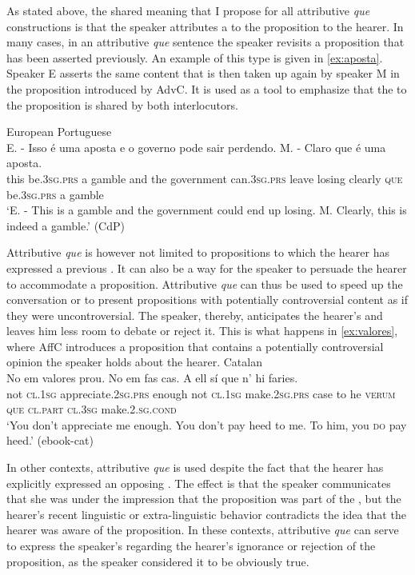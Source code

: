 As stated above, the shared meaning that I propose for all attributive \emph{que} constructions  is that the speaker attributes a  to the proposition to the hearer.  In many cases, in an  attributive \emph{que} sentence the speaker revisits a proposition that has been asserted previously. An example of this type  is given in \eqref{ex:aposta}. Speaker E asserts the same  content that is then taken up again by speaker M in the proposition introduced by AdvC. It is used as a tool to emphasize that the  to the proposition is shared by both interlocutors.\pagebreak


\ea\label{ex:aposta}
European Portuguese\\ 
\gll  E. - Isso é uma aposta e o governo pode sair perdendo.  M. - Claro que é uma aposta. \\
{} {} this be.\textsc{3sg.prs} a gamble and the government can.\textsc{3sg.prs} leave losing {} {} clearly \textsc{que} be.\textsc{3sg.prs} a gamble\\
\glt `E. - This is a gamble and the government could end up losing. M. Clearly, this is indeed a gamble.' (CdP)
\z 

Attributive \textit{que} is however not limited to propositions to which  the hearer has expressed a previous . It can also be a way for the speaker to persuade the hearer to accommodate a proposition. Attributive \emph{que} can thus be used to speed up the conversation or  to present    propositions with potentially controversial content as if they were uncontroversial. The speaker, thereby, anticipates the hearer's  and leaves him less room to debate or reject it. This is what happens in \eqref{ex:valores}, where  AffC introduces a proposition that contains a potentially controversial opinion the speaker holds about the hearer.
\ea\label{ex:valores}
Catalan\\
\gll No em valores prou. No em fas cas. A ell sí que n' hi faries.   \\
not \textsc{cl.1sg} appreciate.\textsc{2sg.prs} enough not \textsc{cl.1sg} make.\textsc{2sg.prs} case to he  \textsc{verum} \textsc{que} \textsc{cl.part} \textsc{cl.3sg} make.\textsc{2.sg.cond} \\
\glt `You don't appreciate me enough. You don't pay heed to me. To him, you  \textsc{do} pay heed.'
(ebook-cat) 
\z


In other contexts,  attributive \emph{que} is used despite the fact that the hearer has explicitly expressed an opposing . The effect is that the speaker  communicates that she was under the impression that the proposition was part of the , but the hearer's recent linguistic or extra-linguistic behavior  contradicts the idea that the hearer was aware of  the proposition. In these contexts, attributive \emph{que} can serve to  express the speaker's  regarding the hearer's ignorance or rejection of the proposition, as  the speaker considered it to be obviously true.

